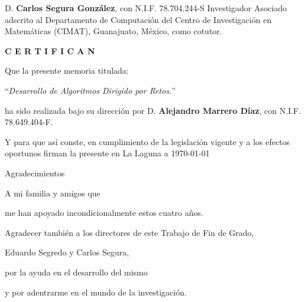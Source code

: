 \documentclass[spanish,a4paper,14pt,oneside]{extreport}
\begin{document}
\bigskip
D. {\bf Carlos Segura González}, con N.I.F. 78.704.244-S
Investigador 
Asociado adscrito al Departamento de Computación del Centro de Investigación en
Matemáticas (CIMAT), Guanajuato, México, como cotutor.

\bigskip
\bigskip
{\bf C E R T I F I C A N}

\bigskip
\bigskip
\bigskip
Que la presente memoria titulada:

\bigskip
``{\it Desarrollo de Algoritmos Dirigido por Retos.}''

\bigskip
\bigskip
\bigskip

\noindent ha sido realizada bajo su dirección por D. {\bf Alejandro Marrero Díaz},
con N.I.F. 78.649.404-F.

\bigskip
\bigskip

Y para que así conste, en cumplimiento de la legislación vigente y a los efectos
oportunos firman la presente en La Laguna a \today

\newpage
\thispagestyle{empty}

{ \flushright

\begin{LARGE}
Agradecimientos
\end{LARGE}

\hspace{3mm}

\begin{large}


\hspace{3mm}
A mi familia y amigos que

\hspace{3mm}
me han apoyado incondicionalmente estos cuatro años.

\bigskip

\hspace{3mm}
Agradecer también a los directores de este Trabajo de Fin de Grado,

\hspace{3mm}
Eduardo Segredo y Carlos Segura,

\hspace{3mm}
por la ayuda en el desarrollo del mismo

\hspace{3mm}
y por adentrarme en el mundo de la investigación.

\end{large}

}

\newpage
\end{document}
